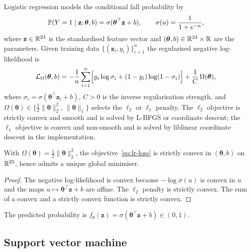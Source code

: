 Logistic regression models the conditional fall probability by
\begin{equation}
  \mathbb{P}(Y=1\mid\mathbf{z};\boldsymbol\theta,b)=\sigma(\boldsymbol\theta^\top\mathbf{z}+b),
  \qquad
  \sigma(u)=\frac{1}{1+e^{-u}},
  \label{eq:lr-sigmoid}
\end{equation}
where $\mathbf{z}\in\mathbb{R}^{24}$ is the standardised feature vector and $(\boldsymbol\theta,b)\in\mathbb{R}^{24}\times\mathbb{R}$ are the parameters. Given training data $\{(\mathbf{z}_i,y_i)\}_{i=1}^n$ the regularised negative log-likelihood is
\begin{equation}
  \mathcal{L}_\Omega(\boldsymbol\theta,b)
  =-\frac{1}{n}\sum_{i=1}^n\Bigl[y_i\log\sigma_i+(1-y_i)\log(1-\sigma_i)\Bigr]
  +\frac{1}{C}\,\Omega(\boldsymbol\theta),
  \label{eq:lr-loss}
\end{equation}
where $\sigma_i=\sigma(\boldsymbol\theta^\top\mathbf{z}_i+b)$, $C>0$ is the inverse regularisation strength, and $\Omega(\boldsymbol\theta)\in\{\tfrac12\|\boldsymbol\theta\|_2^2,\,\|\boldsymbol\theta\|_1\}$ selects the $\ell_2$ or $\ell_1$ penalty. The $\ell_2$ objective is strictly convex and smooth and is solved by L-BFGS or coordinate descent; the $\ell_1$ objective is convex and non-smooth and is solved by liblinear coordinate descent in the implementation.

\begin{proposition}
\label{prop:lr-convex}
With $\Omega(\boldsymbol\theta)=\tfrac12\|\boldsymbol\theta\|_2^2$, the objective~\eqref{eq:lr-loss} is strictly convex in $(\boldsymbol\theta,b)$ on $\mathbb{R}^{25}$, hence admits a unique global minimiser.
\end{proposition}

\begin{proof}
The negative log-likelihood is convex because $-\log\sigma(u)$ is convex in $u$ and the maps $u\mapsto\boldsymbol\theta^\top\mathbf{z}+b$ are affine. The $\ell_2$ penalty is strictly convex. The sum of a convex and a strictly convex function is strictly convex.
\end{proof}

The predicted probability is $f_\theta(\mathbf{z})=\sigma(\boldsymbol\theta^\top\mathbf{z}+b)\in(0,1)$.

\subsection{Support vector machine}
\label{subsubsec:svm}

